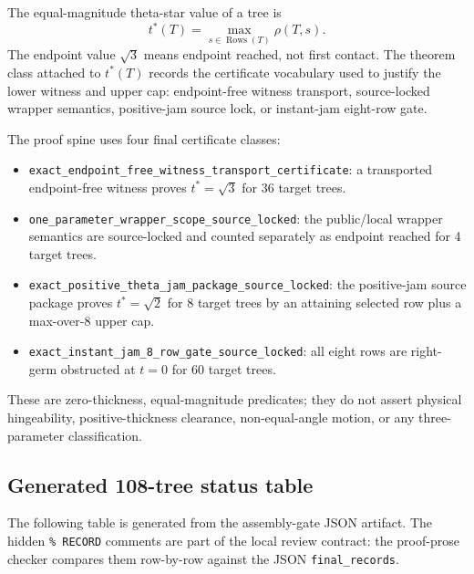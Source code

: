 \begin{definition}
The equal-magnitude theta-star value of a tree is
\[
  t^*(T)=\max_{s\in\operatorname{Rows}(T)} \rho(T,s).
\]
The endpoint value \(\sqrt{3}\) means endpoint reached, not first contact.  The theorem class attached to \(t^*(T)\) records the certificate vocabulary used to justify the lower witness and upper cap: endpoint-free witness transport, source-locked wrapper semantics, positive-jam source lock, or instant-jam eight-row gate.
\end{definition}

\begin{definition}
The proof spine uses four final certificate classes:
\begin{itemize}
\item \texttt{exact\_endpoint\_free\_witness\_transport\_certificate}: a transported endpoint-free witness proves \(t^*=\sqrt{3}\) for 36 target trees.
\item \texttt{one\_parameter\_wrapper\_scope\_source\_locked}: the public/local wrapper semantics are source-locked and counted separately as endpoint reached for 4 target trees.
\item \texttt{exact\_positive\_theta\_jam\_package\_source\_locked}: the positive-jam source package proves \(t^*=\sqrt{2}\) for 8 target trees by an attaining selected row plus a max-over-8 upper cap.
\item \texttt{exact\_instant\_jam\_8\_row\_gate\_source\_locked}: all eight rows are right-germ obstructed at \(t=0\) for 60 target trees.
\end{itemize}
These are zero-thickness, equal-magnitude predicates; they do not assert physical hingeability, positive-thickness clearance, non-equal-angle motion, or any three-parameter classification.
\end{definition}

\subsection{Generated 108-tree status table}

The following table is generated from the assembly-gate JSON artifact.  The hidden \texttt{\% RECORD} comments are part of the local review contract: the proof-prose checker compares them row-by-row against the JSON \texttt{final\_records}.

